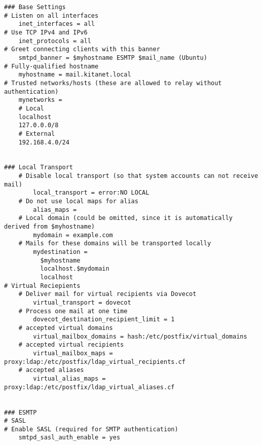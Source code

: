 \begin{lstlisting}[caption={/etc/postfix/main.cf}, label={postfix/main.cf}]
### Base Settings
# Listen on all interfaces
	inet_interfaces = all
# Use TCP IPv4 and IPv6
	inet_protocols = all
# Greet connecting clients with this banner
	smtpd_banner = $myhostname ESMTP $mail_name (Ubuntu)
# Fully-qualified hostname
	myhostname = mail.kitanet.local
# Trusted networks/hosts (these are allowed to relay without authentication)
	mynetworks =
    # Local
    localhost
    127.0.0.0/8
    # External
    192.168.4.0/24


### Local Transport
	# Disable local transport (so that system accounts can not receive mail)
		local_transport = error:NO LOCAL
	# Do not use local maps for alias
		alias_maps = 
	# Local domain (could be omitted, since it is automatically derived from $myhostname)
		mydomain = example.com
	# Mails for these domains will be transported locally
		mydestination =
		  $myhostname
		  localhost.$mydomain
		  localhost
# Virtual Reciepients
	# Deliver mail for virtual recipients via Dovecot
		virtual_transport = dovecot
	# Process one mail at one time
		dovecot_destination_recipient_limit = 1
	# accepted virtual domains
		virtual_mailbox_domains = hash:/etc/postfix/virtual_domains
	# accepted virtual recipients
		virtual_mailbox_maps = proxy:ldap:/etc/postfix/ldap_virtual_recipients.cf
	# accepted aliases
		virtual_alias_maps = proxy:ldap:/etc/postfix/ldap_virtual_aliases.cf


### ESMTP 
# SASL
# Enable SASL (required for SMTP authentication)
	smtpd_sasl_auth_enable = yes


\end{lstlisting}
